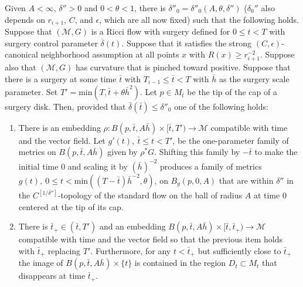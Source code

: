 \begin{proposition}
\label{prop:surgery-cap-evolution-alternative}
\label{altern}
Given $A<\infty$, $\delta''>0$ and $0<\theta<1$, there is
$\delta''_0=\delta''_0(A,\theta,\delta'')$ ($\delta_0''$ also
depends on $r_{i+1}$, $C$, and $\epsilon$, which are all now fixed)
such that the following holds. Suppose that $({\mathcal M},G)$ is a
Ricci flow with surgery defined for $0\le t<T$ with surgery control
parameter $\overline\delta(t)$. Suppose that it satisfies the strong
$(C,\epsilon)$-canonical neighborhood assumption at all points $x$
with $R(x)\ge r_{i+1}^{-2}$. Suppose also that $({\mathcal M},G)$ has
curvature that is pinched toward positive. Suppose that there is a
surgery at some time $\bar t$ with $T_{i-1}\le \bar t<T$ with $\bar
h$ as the surgery scale parameter. Set $T'=\mathrm{min}(T,\bar t+\theta
\bar h^2)$. Let $p\in M_{\bar t}$ be the tip of the cap of a surgery
disk. Then, provided that $\bar\delta(\bar t)\le \delta''_0$ one of
the following holds:
\begin{enumerate}
\item[(a)] There is an embedding $\rho\colon B(p,\bar t,A\bar h)\times [\bar t,T')\to {\mathcal M}$
compatible with time and the vector field. Let $g'(t),\ \bar t\le
t<T'$, be the one-parameter family of metrics on $B(p,\bar t,A\bar
h)$ given by $\rho^*G$. Shifting this family by $-\bar t$ to make
the initial time $0$ and scaling it by $(\bar h)^{-2}$ produces a
family of metrics $g(t),\ 0\le t<\mathrm{min}((T-\bar t)\bar
h^{-2},\theta)$, on $B_{g}(p,0,A)$ that are within $\delta''$ in the
$C^{[1/\delta'']}$-topology of the standard flow on the ball of
radius $A$ at time $0$ centered at the tip of its cap.
\item[(b)] There is $\bar t_+\in (\bar t,T')$ and an embedding
$B(p,\bar t,A\bar h)\times [\bar t,\bar t_+)\to {\mathcal M}$
compatible with time and the vector field so that the previous item
holds with $\bar t_+$ replacing $T'$. Furthermore, for any $t<\bar
t_+$ but sufficiently close to $\bar t_+$ the image of $B(p,\bar
t,A\bar h)\times\{t\}$ is contained in the region $D_{t}\subset M_t$
that disappears at time $\bar t_+$.
\end{enumerate}

\end{proposition}




